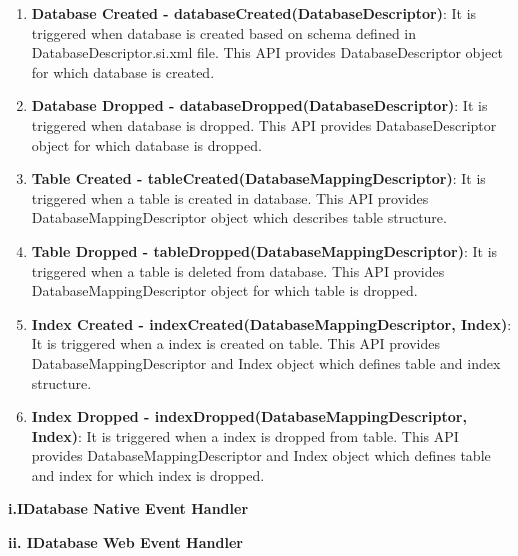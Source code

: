 		\begin{enumerate}

			\item \small \textbf{Database Created - databaseCreated(DatabaseDescriptor)}: It is triggered when database is created based on schema defined in DatabaseDescriptor.si.xml file. This API provides DatabaseDescriptor object for which database is created.

			\item \small \textbf{Database Dropped - databaseDropped(DatabaseDescriptor)}: It is triggered when database is dropped. This API provides DatabaseDescriptor object for which database is dropped.


			\item \small \textbf{Table Created - tableCreated(DatabaseMappingDescriptor)}: It is triggered when a table is created in database. This API provides DatabaseMappingDescriptor object which describes table structure.


			\item \small \textbf{Table Dropped - tableDropped(DatabaseMappingDescriptor)}: It is triggered when a table is deleted from database. This API provides DatabaseMappingDescriptor object for which table is dropped.


			\item \small \textbf{Index Created - indexCreated(DatabaseMappingDescriptor, Index)}: It is triggered when a index is created on table. This API provides DatabaseMappingDescriptor and Index object which defines table and index structure.

			
			\item \small \textbf{Index Dropped - indexDropped(DatabaseMappingDescriptor, Index)}: It is triggered when a index is dropped from table. This API provides DatabaseMappingDescriptor and Index object which defines table and index for which index is dropped.

		\end{enumerate}



		\textbf{i.IDatabase Native Event Handler}
			
			
		
		\textbf{ii. IDatabase Web Event Handler}

			
